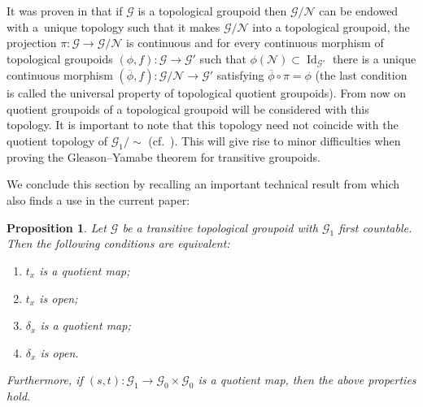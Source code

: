 \documentclass[11pt]{article}
\newtheorem{prop}[tw]{Proposition}
\begin{document}
It was proven in \cite{BH} that if $\mathcal{G}$ is a topological groupoid then $\mathcal{G}\slash\mathcal{N}$ can be endowed with a~unique topology such that it makes $\mathcal{G}\slash\mathcal{N}$ into a topological groupoid, the projection $\pi\colon \mathcal{G}\rightarrow\mathcal{G}\slash\mathcal{N}$ is continuous and for every continuous morphism of topological groupoids $(\phi,f)\colon \mathcal{G}\rightarrow\mathcal{G'}$ such that $\phi (\mathcal{N})\subset \operatorname{Id}_{\mathcal{G}'}$ there is a unique continuous morphism $(\overline{\phi},f)\colon \mathcal{G}\slash\mathcal{N}\rightarrow\mathcal{G}'$ satisfying $\overline{\phi}\circ\pi=\phi$ (the last condition is called the universal property of topological quotient groupoids). From now on quotient groupoids of a topological groupoid will be considered with this topology. It is important to note that this topology need not coincide with the quotient topology of $\mathcal{G}_1\slash\sim$ (cf.~\cite{McK1}). This will give rise to minor difficulties when proving the Gleason--Yamabe theorem for transitive groupoids.

We conclude this section by recalling an important technical result from \cite{H5oids} which also finds a use in the current paper:
\begin{prop}\label{eq} Let $\mathcal{G}$ be a transitive topological groupoid with $\mathcal{G}_1$ first countable. Then the following conditions are equivalent:
\begin{enumerate}\itemsep=0pt
\item[$1)$] $t_x$ is a quotient map;
\item[$2)$] $t_x$ is open;
\item[$3)$] $\delta_x$ is a quotient map;
\item[$4)$] $\delta_x$ is open.
\end{enumerate}
Furthermore, if $(s,t)\colon \mathcal{G}_1\rightarrow \mathcal{G}_0\times\mathcal{G}_0$ is a quotient map, then the above properties hold.
\end{prop}
\end{document}
